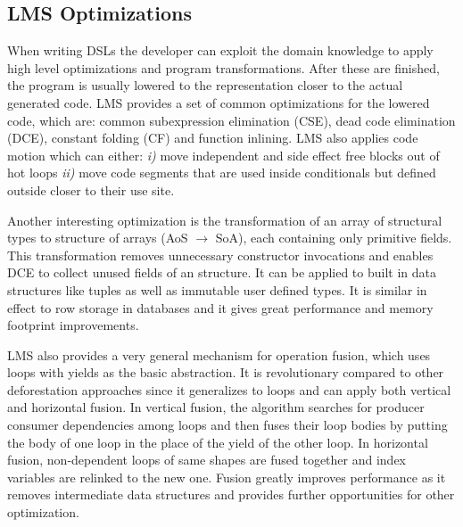 \subsection{LMS Optimizations}
\label{subsec:lms-optimizations}
When writing DSLs the developer can exploit the domain knowledge to apply high level optimizations and program transformations. After these are finished, the program is usually lowered to the representation closer to the actual generated code. LMS provides a set of common optimizations for the lowered code, which are: common subexpression elimination (CSE), dead code elimination (DCE), constant folding (CF) and function inlining. LMS also applies code motion which can either: \emph{i)} move independent and side effect free blocks out of hot loops \emph{ii)} move code segments that are used inside conditionals but defined outside closer to their use site.   

Another interesting optimization is the transformation of an array of structural types to structure of arrays (AoS $\rightarrow$ SoA), each containing only primitive fields. This transformation removes unnecessary constructor invocations and enables DCE to collect unused fields of an structure. It can be applied to built in data structures like tuples as well as immutable user defined types. It is similar in effect to row storage in databases and it gives great performance and memory footprint improvements.

LMS also provides a very general mechanism for operation fusion, which uses loops with yields as the basic abstraction. It is revolutionary compared to other deforestation approaches since it generalizes to loops and can apply both vertical and horizontal fusion. In vertical fusion, the algorithm searches for producer consumer dependencies among loops and then fuses their loop bodies by putting the body of one loop in the place of the yield of the other loop. In horizontal fusion, non-dependent loops of same shapes are fused together and index variables are relinked to the new one. Fusion greatly improves performance as it removes intermediate data structures and provides further opportunities for other optimization.


